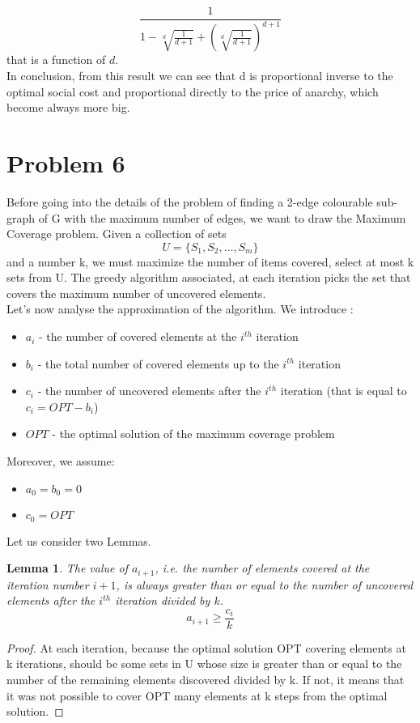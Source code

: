 \documentclass[a4paper,11pt]{article}
\begin{document}
 
$$ \frac {1} { 1- \sqrt[d]{\frac {1}{d+1}} + \left( \sqrt[d]{\frac {1}{d+1}}\right) ^{d+1}}$$
that is a function of $ d $.\\
In conclusion, from this result we can see that d is proportional inverse  to the optimal social cost and proportional directly to the price of anarchy, which become always more big.

\clearpage

\section{Problem 6}
Before going into the details of the problem of finding a 2-edge colourable sub-graph of G with the maximum number of edges, we want to draw the Maximum Coverage problem. 
Given a collection of sets $$U = \{ S_1,S_2, \dots , S_m \}$$ and a number k, we must maximize the number of items covered, select at most k sets from U. The greedy algorithm associated, at each iteration picks the set that covers the maximum number of uncovered elements.\\
Let's now analyse the approximation of the algorithm. We introduce :
\begin{itemize}
\item
$a_i$ - the number of covered elements at the $i^{th}$ iteration
\item
$b_i$ - the total number of covered elements up to the $i^{th}$ iteration
\item
$c_i$ - the number of uncovered elements after the $i^{th}$  iteration (that is equal to $c_i = OPT - b_i$)
\item
$OPT$ - the optimal solution of the maximum coverage problem
\end{itemize}
Moreover, we assume:
\begin{itemize}
\item
$a_0=b_0=0$
\item
$c_0=OPT$

\end{itemize}
Let us consider two Lemmas.\\
\newtheorem{lemma}{Lemma}
\begin{lemma}
	The value of $a_{i+1}$, i.e. the number of elements covered at the iteration number $i +1$, is always greater than or equal to the number of uncovered elements after the $i^{th}$ iteration divided by $k$. 
	$$a_{i+1} \geq \frac{c_i}{k} $$
\end{lemma}

\begin{proof}
	At each iteration, because the optimal solution OPT covering elements at k iterations, should be some sets in U whose size is greater than or equal to the number of the remaining elements discovered divided by k. If not, it means that it was not possible to cover OPT many elements at k steps from the optimal solution.
\end{proof}
\end{document}

